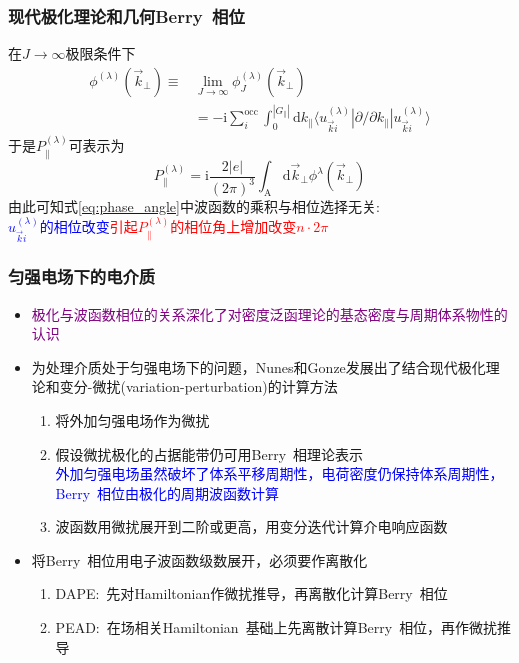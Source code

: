 \documentclass[cjk,slidestop,compress,mathserif,blue]{beamer}
\newcommand{\upcite}[1]{\hspace{0ex}\textsuperscript{\cite{#1}}} %
\begin{document}
\frame
{
	\frametitle{现代极化理论和几何\textrm{Berry~}相位}
	在$J\rightarrow\infty$极限条件下
	\begin{displaymath}
		\begin{aligned}
			\phi^{(\lambda)}(\vec k_{\bot})\equiv&\lim_{J\rightarrow\infty}\phi_J^{(\lambda)}(\vec k_{\bot})\\
			&=-\mathrm{i}\sum_{i}^{\mathrm{occ}}\int_0^{|G_{\lVert}|}\mathrm{d}k_{\lVert}\langle u_{\vec k i}^{(\lambda)}|\partial/\partial k_{\lVert}|u_{\vec k i}^{(\lambda)}\rangle
		\end{aligned}
	\end{displaymath}
	于是$P_{\lVert}^{(\lambda)}$可表示为
	\begin{displaymath}
		P_{\lVert}^{(\lambda)}=\mathrm{i}\frac{2|e|}{(2\pi)^3}\int_{\mathrm A}\mathrm{d}\vec k_{\bot}\phi^{\lambda}(\vec k_{\bot})
	\end{displaymath}
	由此可知式\eqref{eq:phase_angle}中波函数的乘积与相位选择无关:\\
	\textcolor{blue}{$u_{\vec k i}^{(\lambda)}$的相位改变}\textcolor{red}{引起$P_{\lVert}^{(\lambda)}$的相位角上增加改变$n\cdot2\pi$}
}

\frame
{
	\frametitle{匀强电场下的电介质}
	\begin{itemize}
		\item \textcolor{purple}{极化与波函数相位的关系深化了对密度泛函理论的基态密度与周期体系物性的认识}
		\item 为处理介质处于匀强电场下的问题，\textrm{Nunes}和\textrm{Gonze}发展出了结合现代极化理论和变分-微扰(\textrm{variation-perturbation})的计算方法%
			\begin{enumerate}
				\item 将外加匀强电场作为微扰
				\item 假设微扰极化的占据能带仍可用\textrm{Berry~}相理论表示\\
					\textcolor{blue}{外加匀强电场虽然破坏了体系平移周期性，电荷密度仍保持体系周期性，\textrm{Berry~}相位由极化的周期波函数计算}
				\item 波函数用微扰展开到二阶或更高，用变分迭代计算介电响应函数
			\end{enumerate}
		\item 将\textrm{Berry~}相位用电子波函数级数展开，必须要作离散化\\
			\begin{enumerate}
				\item \textrm{DAPE}:~先对\textrm{Hamiltonian}作微扰推导，再离散化计算\textrm{Berry~}相位
				\item \textrm{PEAD}:~在场相关\textrm{Hamiltonian~}基础上先离散计算\textrm{Berry~}相位，再作微扰推导
			\end{enumerate}
	\end{itemize}
}
\end{document}
